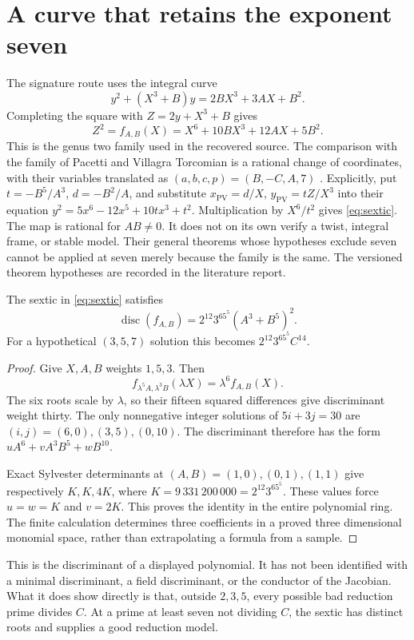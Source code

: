 \section{A curve that retains the exponent seven}\label{sec:frey}
The signature route uses the integral curve
\begin{equation}\label{eq:integralcurve}
y^2+(X^3+B)y=2BX^3+3AX+B^2.
\end{equation}
Completing the square with $Z=2y+X^3+B$ gives
\begin{equation}\label{eq:sextic}
Z^2=f_{A,B}(X)=X^6+10BX^3+12AX+5B^2.
\end{equation}
This is the genus two family used in the recovered source. The comparison with the family of Pacetti and Villagra Torcomian is a rational change of coordinates, with their variables translated as $(a,b,c,p)=(B,-C,A,7)$ \cite{pacetti-villagra2025}. Explicitly, put $t=-B^5/A^3$, $d=-B^2/A$, and substitute $x_{\mathrm{PV}}=d/X$, $y_{\mathrm{PV}}=tZ/X^3$ into their equation $y^2=5x^6-12x^5+10tx^3+t^2$. Multiplication by $X^6/t^2$ gives \eqref{eq:sextic}. The map is rational for $AB\ne0$. It does not on its own verify a twist, integral frame, or stable model. Their general theorems whose hypotheses exclude seven cannot be applied at seven merely because the family is the same. The versioned theorem hypotheses are recorded in the literature report.

\begin{proposition}\label{prop:disc}
The sextic in \eqref{eq:sextic} satisfies
\[
\operatorname{disc}(f_{A,B})=2^{12}3^65^5(A^3+B^5)^2.
\]
For a hypothetical $(3,5,7)$ solution this becomes $2^{12}3^65^5C^{14}$.
\end{proposition}
\begin{proof}
Give $X,A,B$ weights $1,5,3$. Then
\[
f_{\lambda^5A,\lambda^3B}(\lambda X)=\lambda^6f_{A,B}(X).
\]
The six roots scale by $\lambda$, so their fifteen squared differences give discriminant weight thirty. The only nonnegative integer solutions of $5i+3j=30$ are $(i,j)=(6,0),(3,5),(0,10)$. The discriminant therefore has the form $uA^6+vA^3B^5+wB^{10}$.

Exact Sylvester determinants at $(A,B)=(1,0),(0,1),(1,1)$ give respectively $K,K,4K$, where $K=9\,331\,200\,000=2^{12}3^65^5$. These values force $u=w=K$ and $v=2K$. This proves the identity in the entire polynomial ring. The finite calculation determines three coefficients in a proved three dimensional monomial space, rather than extrapolating a formula from a sample.
\end{proof}
This is the discriminant of a displayed polynomial. It has not been identified with a minimal discriminant, a field discriminant, or the conductor of the Jacobian. What it does show directly is that, outside $2,3,5$, every possible bad reduction prime divides $C$. At a prime at least seven not dividing $C$, the sextic has distinct roots and supplies a good reduction model.

